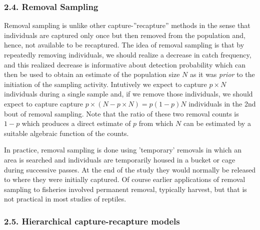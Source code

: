 \documentclass{book}
\begin{document}
\subsubsection*{2.4. Removal Sampling}

Removal sampling is unlike other capture-''recapture'' methods  in the sense
that individuals are captured only once but then removed from the
population and, hence, not available to be recaptured. The idea of
removal sampling is that by repeatedly removing
individuals, we should realize a decrease in catch frequency, and this
realized decrease is informative about
detection probability which can then be used to obtain an estimate
of the population size $N$ as it was {\it prior} to the initiation of the
sampling activity. Intutively we expect to capture $p \times N$
individuals during a single sample and, if we remove those
individuals, we should expect to capture capture $p \times (N - p
\times N) = p(1-p) N$ individuals in the 2nd bout of removal
sampling. Note that the ratio of these two removal counts is $1-p$
which produces a direct estimate of $p$ from which $N$ can be
estimated by a suitable algebraic function of the counts.

In practice, removal sampling is done using 'temporary' removals in
which an area is searched and individuals are temporarily housed in a
bucket or cage during successive passes. At the end of the study they
would normally be released to where they were initially captured. Of
course earlier applications of removal sampling to fisheries involved
permanent removal, typically harvest, but that is not practical in 
most studies of reptiles. 

\subsubsection*{2.5. Hierarchical capture-recapture models}
\end{document}
